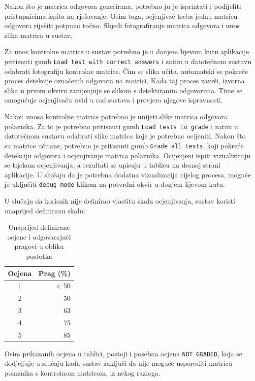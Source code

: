 \documentclass{foi}
\begin{document}
Nakon što je matrica odgovora generirana, potrebno ju je isprintati i podijeliti pristupnicima ispita na rješavanje. Osim toga, ocjenjivač treba jednu matricu odgovora riješiti potpuno točno. Slijedi fotografiranje matrica odgovora i unos slika matrica u sustav.

Za unos kontrolne matrice u sustav potrebno je u donjem lijevom kutu aplikacije pritisnuti gumb \texttt{Load test with correct answers} i zatim u datotečnom sustavu odabrati fotografiju kontrolne matrice. Čim se slika učita, automatski se pokreće proces detekcije označenih odgovora na matrici. Kada taj proces završi, izvorna slika u prvom okviru zamjenjuje se slikom s detektiranim odgovorima. Time se omogućuje ocjenjivaču uvid u rad sustava i provjera njegove ispravnosti.

Nakon unosa kontrolne matrice potrebno je unijeti slike matrica odgovora polaznika. Za to je potrebno pritisnuti gumb \texttt{Load tests to grade} i zatim u datotečnom sustavu odabrati slike matrica koje je potrebno ocijeniti. Nakon što su matrice učitane, potrebno je pritisnuti gumb \texttt{Grade all tests}, koji pokreće detekciju odgovora i ocjenjivanje matrica polaznika. Ocijenjeni ispiti vizualiziraju se tijekom ocjenjivanja, a rezultati se upisuju u tablicu na desnoj strani aplikacije. U slučaju da je potrebna dodatna vizualizacija cijelog procesa, moguće je uključiti \texttt{debug mode} klikom na potvrdni okvir u donjem lijevom kutu.

U slučaju da korisnik nije definirao vlastitu skalu ocjenjivanja, sustav koristi unaprijed definiranu skalu:

\begin{table}[h!]
\centering
\begin{tabular}{|c|r|}
\hline
\textbf{Ocjena} & \textbf{Prag (\%)} \\
\hline
1 & < 50 \\
2 & 50 \\
3 & 63 \\
4 & 75 \\
5 & 85 \\
\hline
\end{tabular}
\caption{Unaprijed definirane ocjene i odgovarajući pragovi u obliku postotka}
\end{table}

Osim prikazanih ocjena u tablici, postoji i posebna ocjena \texttt{NOT GRADED}, koja se dodjeljuje u slučaju kada sustav zaključi da nije moguće usporediti matricu polaznika s kontrolnom matricom, iz nekog razloga.
\end{document}

